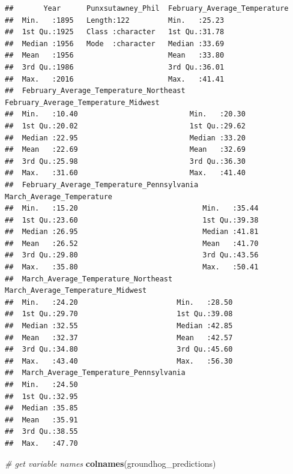 \documentclass[
]{book}
\newenvironment{Shaded}{\begin{snugshade}}{\end{snugshade}}
\newcommand{\CommentTok}[1]{\textcolor[rgb]{0.56,0.35,0.01}{\textit{#1}}}
\newcommand{\KeywordTok}[1]{\textcolor[rgb]{0.13,0.29,0.53}{\textbf{#1}}}
\newcommand{\NormalTok}[1]{#1}
\begin{document}
\begin{verbatim}
##       Year      Punxsutawney_Phil  February_Average_Temperature
##  Min.   :1895   Length:122         Min.   :25.23               
##  1st Qu.:1925   Class :character   1st Qu.:31.78               
##  Median :1956   Mode  :character   Median :33.69               
##  Mean   :1956                      Mean   :33.80               
##  3rd Qu.:1986                      3rd Qu.:36.01               
##  Max.   :2016                      Max.   :41.41               
##  February_Average_Temperature_Northeast February_Average_Temperature_Midwest
##  Min.   :10.40                          Min.   :20.30                       
##  1st Qu.:20.02                          1st Qu.:29.62                       
##  Median :22.95                          Median :33.20                       
##  Mean   :22.69                          Mean   :32.69                       
##  3rd Qu.:25.98                          3rd Qu.:36.30                       
##  Max.   :31.60                          Max.   :41.40                       
##  February_Average_Temperature_Pennsylvania March_Average_Temperature
##  Min.   :15.20                             Min.   :35.44            
##  1st Qu.:23.60                             1st Qu.:39.38            
##  Median :26.95                             Median :41.81            
##  Mean   :26.52                             Mean   :41.70            
##  3rd Qu.:29.80                             3rd Qu.:43.56            
##  Max.   :35.80                             Max.   :50.41            
##  March_Average_Temperature_Northeast March_Average_Temperature_Midwest
##  Min.   :24.20                       Min.   :28.50                    
##  1st Qu.:29.70                       1st Qu.:39.08                    
##  Median :32.55                       Median :42.85                    
##  Mean   :32.37                       Mean   :42.57                    
##  3rd Qu.:34.80                       3rd Qu.:45.60                    
##  Max.   :43.40                       Max.   :56.30                    
##  March_Average_Temperature_Pennsylvania
##  Min.   :24.50                         
##  1st Qu.:32.95                         
##  Median :35.85                         
##  Mean   :35.91                         
##  3rd Qu.:38.55                         
##  Max.   :47.70
\end{verbatim}

\begin{Shaded}
\begin{Highlighting}[]
\CommentTok{# get variable names}
\KeywordTok{colnames}\NormalTok{(groundhog_predictions)}
\end{Highlighting}
\end{Shaded}
\end{document}
